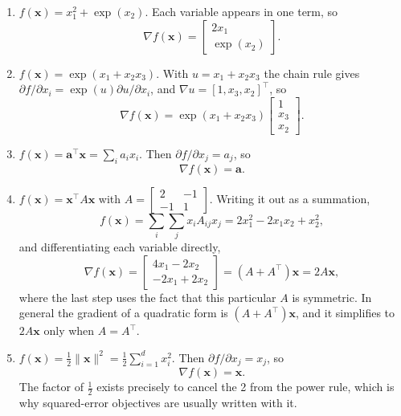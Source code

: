 \documentclass[11pt]{article}
\begin{document}
\begin{enumerate}
  \item $f(\mathbf{x}) = x_1^2 + \exp(x_2)$. Each variable appears in one term, so
        \[ \nabla f(\mathbf{x}) = \begin{bmatrix} 2x_1 \\ \exp(x_2) \end{bmatrix}. \]

  \item $f(\mathbf{x}) = \exp(x_1 + x_2 x_3)$. With $u = x_1 + x_2x_3$ the chain rule gives
        $\partial f/\partial x_i = \exp(u)\partial u/\partial x_i$, and $\nabla u = [1, x_3, x_2]^\top$, so
        \[
          \nabla f(\mathbf{x}) = \exp(x_1 + x_2x_3)\begin{bmatrix} 1 \\ x_3 \\ x_2\end{bmatrix}.
        \]

  \item $f(\mathbf{x}) = \mathbf{a}^\top\mathbf{x} = \sum_i a_i x_i$. Then
        $\partial f/\partial x_j = a_j$, so
        \[ \nabla f(\mathbf{x}) = \mathbf{a}. \]

  \item $f(\mathbf{x}) = \mathbf{x}^\top A \mathbf{x}$ with
        $A = \begin{bmatrix} 2&-1\\-1&1\end{bmatrix}$. Writing it out as a summation,
        \[
          f(\mathbf{x}) = \sum_{i}\sum_{j} x_i A_{ij} x_j = 2x_1^2 - 2x_1x_2 + x_2^2,
        \]
        and differentiating each variable directly,
        \[
          \nabla f(\mathbf{x}) = \begin{bmatrix} 4x_1 - 2x_2 \\ -2x_1 + 2x_2\end{bmatrix}
          = (A + A^\top)\mathbf{x} = 2A\mathbf{x},
        \]
        where the last step uses the fact that this particular $A$ is symmetric. In general the gradient
        of a quadratic form is $(A + A^\top)\mathbf{x}$, and it simplifies to $2A\mathbf{x}$ only when
        $A = A^\top$.

  \item $f(\mathbf{x}) = \frac{1}{2}\|\mathbf{x}\|^2 = \frac{1}{2}\sum_{i=1}^{d} x_i^2$. Then
        $\partial f/\partial x_j = x_j$, so
        \[ \nabla f(\mathbf{x}) = \mathbf{x}. \]
        The factor of $\frac{1}{2}$ exists precisely to cancel the 2 from the power rule, which is why
        squared-error objectives are usually written with it.
\end{enumerate}
\end{document}
